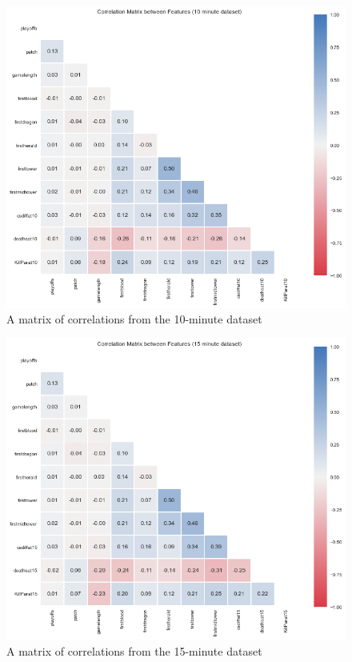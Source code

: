 \begin{figure}[h!]
    \centering
    \includegraphics[width=1\textwidth]{figures/CorrMat10}
    \caption{A matrix of correlations from the 10-minute dataset}
    \label{fig:CorrMat10}
\end{figure}

\begin{figure}[h!]
    \centering
    \includegraphics[width=1\textwidth]{figures/CorrMat15}
    \caption{A matrix of correlations from the 15-minute dataset}
    \label{fig:CorrMat15}
\end{figure}

